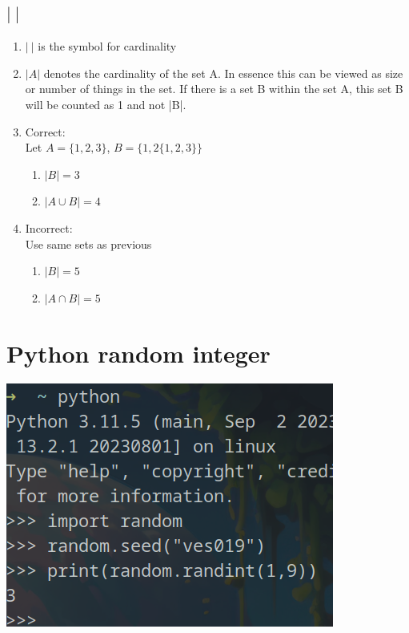 \documentclass{article}
\begin{document}
\subsection{$| \ |$}
\begin{enumerate}
    \item $| \  |$ is the symbol for cardinality
    \item $|A|$ denotes the cardinality of the set A. In essence this can be viewed as size or number of things in the set. If there is a set B within the set A, this set B will be counted as 1 and not |B|.
    \item Correct: \\ Let $A = \{1,2,3\}$, $B = \{1,2\{1,2,3\}\}$
    \begin{enumerate}
        \item $|B| = 3$
        \item $|A \cup B| = 4$
    \end{enumerate}
    \item Incorrect: \\ Use same sets as previous
    \begin{enumerate}
        \item $|B| = 5$
        \item $|A \cap B| = 5$
    \end{enumerate}
\end{enumerate}


\section{Python random integer}
\includegraphics[scale=0.5]
{pythonRandInt.png}
\end{document}

